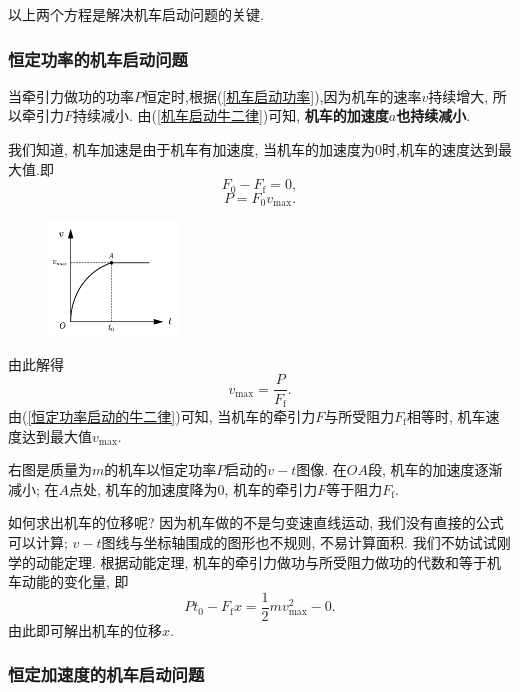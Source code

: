 \documentclass[11pt,a4paper]{ctexart}
\begin{document}
以上两个方程是解决机车启动问题的关键.

\subsubsection*{恒定功率的机车启动问题}

当牵引力做功的功率$P$恒定时,根据(\ref{机车启动功率}),因为机车的速率$v$持续增大,
所以牵引力$F$持续减小. 由(\ref{机车启动牛二律})可知, \textbf{机车的加速度$a$也持续减小}.

我们知道, 机车加速是由于机车有加速度, 当机车的加速度为0时,机车的速度达到最大值.即
\begin{equation}
	F_0 - F_\mathrm{f} = 0,
	\label{恒定功率启动的牛二律}
\end{equation}
\begin{equation*}
	P = F_0v_\mathrm{max}.
\end{equation*}
\begin{figure}
	\flushright
	\includegraphics[width=0.31\textwidth]{pic/pic10.pdf}
	\label{fic10}
\end{figure}
由此解得
\begin{equation}
	v_\mathrm{max} = \frac{P}{F_\mathrm{f}}.
	\label{最大速度}
\end{equation}
由(\ref{恒定功率启动的牛二律})可知, 当机车的牵引力$F$与所受阻力$F_\mathrm{f}$相等时, 机车速度达到最大值$v_\mathrm{max}$.

右图是质量为$m$的机车以恒定功率$P$启动的$v-t$图像. 在$OA$段, 机车的加速度逐渐减小;
在$A$点处, 机车的加速度降为0, 机车的牵引力$F$等于阻力$F_\mathrm{f}$.

如何求出机车的位移呢? 因为机车做的不是匀变速直线运动, 我们没有直接的公式可以计算;
$v - t$图线与坐标轴围成的图形也不规则, 不易计算面积. 我们不妨试试刚学的动能定理.
根据动能定理, 机车的牵引力做功与所受阻力做功的代数和等于机车动能的变化量, 即
$$Pt_0 - F_\mathrm{f}x = \frac12 m v_\mathrm{max}^2 - 0.$$
由此即可解出机车的位移$x$.

\subsubsection*{恒定加速度的机车启动问题}
\end{document}
